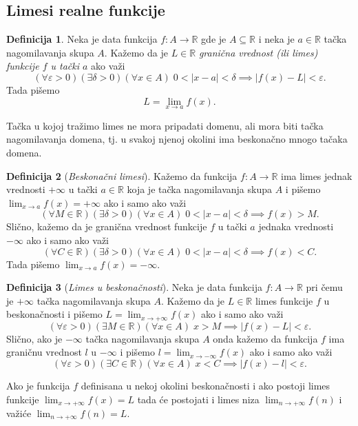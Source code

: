 \documentclass[a4paper,12pt]{article}
\theoremstyle{plain}
\theoremstyle{definition}
\newtheorem{definition}{Definicija}[section]
\theoremstyle{remark}
\begin{document}
\subsection{Limesi realne funkcije}
\begin{definition}
    \label{def15-3}
    Neka je data funkcija $f : A \to \mathbb{R}$ gde je $A \subseteq \mathbb{R}$ i neka je $a \in \mathbb{R}$ tačka nagomilavanja skupa $A$. Kažemo da je $L \in \mathbb{R}$ \textit{granična vrednost (ili limes) funkcije $f$ u tački $a$} ako važi
    \[ (\forall \varepsilon > 0)(\exists \delta > 0)(\forall x \in A) \; 0 < |x - a| < \delta \implies |f(x) - L| < \varepsilon. \]
    Tada pišemo
    \[ L = \lim_{x \to a} f(x). \]
\end{definition}
Tačka u kojoj tražimo limes ne mora pripadati domenu, ali mora biti tačka nagomilavanja domena, tj. u svakoj njenoj okolini ima beskonačno mnogo tačaka domena.
\begin{definition}[\textit{Beskonačni limesi}]
    Kažemo da funkcija $f : A \to \mathbb{R}$ ima limes jednak vrednosti $+\infty$ u tački $a \in \mathbb{R}$ koja je tačka nagomilavanja skupa $A$ i pišemo $\displaystyle \lim_{x \to a} f(x) = +\infty$ ako i samo ako važi
    \[ (\forall M \in \mathbb{R})(\exists \delta > 0)(\forall x \in A) \; 0 < |x - a| < \delta \implies f(x) > M. \]
    Slično, kažemo da je granična vrednost funkcije $f$ u tački $a$ jednaka vrednosti $-\infty$ ako i samo ako važi
    \[ (\forall C \in \mathbb{R})(\exists \delta > 0)(\forall x \in A) \; 0 < |x - a| < \delta \implies f(x) < C. \]
    Tada pišemo $\displaystyle \lim_{x \to a} f(x) = -\infty$.
\end{definition}
\begin{definition}[\textit{Limes u beskonačnosti}]
    Neka je data funkcija $f : A \to \mathbb{R}$ pri čemu je $+\infty$ tačka nagomilavanja skupa $A$. Kažemo da je $L \in \mathbb{R}$ limes funkcije $f$ u beskonačnosti i pišemo $\displaystyle L = \lim_{x \to +\infty} f(x)$ ako i samo ako važi
    \[ (\forall \varepsilon > 0)(\exists M \in \mathbb{R})(\forall x \in A) \; x > M \implies |f(x) - L| < \varepsilon. \]
    Slično, ako je $-\infty$ tačka nagomilavanja skupa $A$ onda kažemo da funkcija $f$ ima graničnu vrednost $l$ u $-\infty$ i pišemo $\displaystyle l = \lim_{x \to -\infty} f(x)$ ako i samo ako važi
    \[ (\forall \varepsilon > 0)(\exists C \in \mathbb{R})(\forall x \in A) \; x < C \implies |f(x) - l| < \varepsilon. \]
\end{definition}
Ako je funkcija $f$ definisana u nekoj okolini beskonačnosti i ako postoji limes funkcije $\displaystyle \lim_{x \to +\infty} f(x) = L$ tada će postojati i limes niza $\displaystyle \lim_{n \to +\infty} f(n)$ i važiće $\displaystyle \lim_{n \to +\infty} f(n) = L$.
\end{document}

